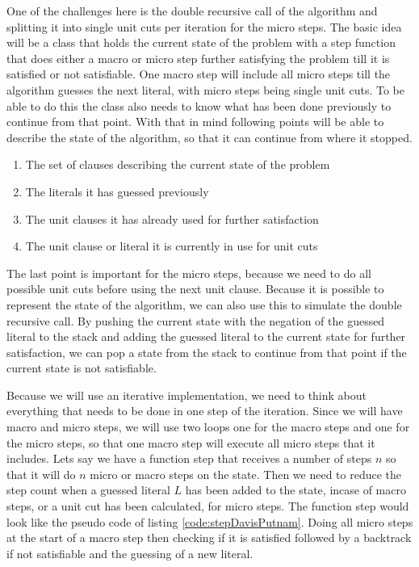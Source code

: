 One of the challenges here is the double recursive call of the algorithm and splitting it into single unit cuts per iteration for the micro steps. The basic idea will be a class that holds the current state of the problem with a step function that does either a macro or micro step further satisfying the problem till it is satisfied or not satisfiable. One macro step will include all micro steps till the algorithm guesses the next literal, with micro steps being single unit cuts. To be able to do this the class also needs to know what has been done previously to continue from that point. With that in mind following points will be able to describe the state of the algorithm, so that it can continue from where it stopped.

\begin{enumerate}
    \item The set of clauses describing the current state of the problem
    \item The literals it has guessed previously
    \item The unit clauses it has already used for further satisfaction
    \item The unit clause or literal it is currently in use for unit cuts
\end{enumerate}

The last point is important for the micro steps, because we need to do all possible unit cuts before using the next unit clause. Because it is possible to represent the state of the algorithm, we can also use this to simulate the double recursive call. By pushing the current state with the negation of the guessed literal to the stack and adding the guessed literal to the current state for further satisfaction, we can pop a state from the stack to continue from that point if the current state is not satisfiable.

Because we will use an iterative implementation, we need to think about everything that needs to be done in one step of the iteration. Since we will have macro and micro steps, we will use two loops one for the macro steps and one for the micro steps, so that one macro step will execute all micro steps that it includes. Lets say we have a function step that receives a number of steps $n$ so that it will do $n$ micro or macro steps on the state. Then we need to reduce the step count when a guessed literal $L$ has been added to the state, incase of macro steps, or a unit cut has been calculated, for micro steps. The function step would look like the pseudo code of listing \ref{code:stepDavisPutnam}. Doing all micro steps at the start of a macro step then checking if it is satisfied followed by a backtrack if not satisfiable and the guessing of a new literal.

